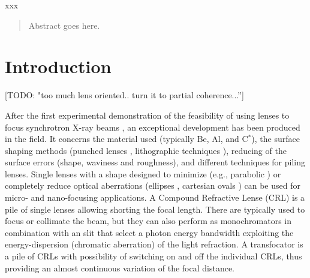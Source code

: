 \documentclass{iucr}              %
\newcommand{\todo}[1]{{\color{red}[TODO: "#1'']}}
\begin{document}
\maketitle                        %

\begin{synopsis}
xxx
\end{synopsis}

\begin{abstract}
Abstract goes here.
\end{abstract}



\section{Introduction}

\todo{too much lens oriented.. turn it to partial coherence...}

After the first experimental demonstration of the feasibility of using lenses to focus synchrotron X-ray beams \cite{Snigirev1996}, an exceptional development has been produced in the field. It concerns the material used (typically Be, Al, and C$^*$), the surface shaping methods (punched lenses \cite{XX}, lithographic techniques \cite{XX}), reducing of the surface errors (shape, waviness and roughness), and different techniques for piling lenses. Single lenses with a shape designed to minimize (e.g., parabolic \cite{XX}) or completely reduce optical aberrations (ellipses \cite{XX}, cartesian ovals \cite{XX}) can be used for micro- and nano-focusing \cite{XX} applications. A Compound Refractive Lense (CRL) is a pile of single lenses allowing shorting the focal length. There are typically used to focus or collimate the beam, but they can also perform as monochromators in combination with an slit that select a photon energy bandwidth exploiting the energy-dispersion (chromatic aberration) of the light refraction. A transfocator is a pile of CRLs with possibility of switching on and off the individual CRLs, thus providing an almost continuous variation of the focal distance. 
\end{document}
